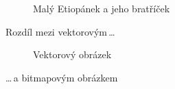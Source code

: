 \documentclass[a4paper, 11pt]{article}
\begin{document}
\begin{figure}[h]
{			
		}
		\caption{Malý Etiopánek a jeho bratříček}
		\label{figure:etiopan}
	\end{figure}

	\newpage

	Rozdíl mezi vektorovým\,\dots

	\begin{figure}[h]
		\centering
		\caption{Vektorový obrázek}
		\label{figure:oniisan}
	\end{figure}
	\bigskip
	\noindent \dots\,a bitmapovým obrázkem
\end{document}
